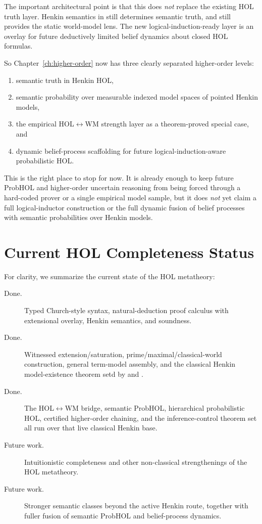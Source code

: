 \documentclass[11pt,openany]{report}
\begin{document}
The important architectural point is that this does \emph{not} replace the
existing HOL truth layer.  Henkin semantics in
 still determines semantic
truth, and  still provides the
static world-model lens.  The new logical-induction-ready layer is an overlay
for future deductively limited belief dynamics about closed HOL formulas.

So Chapter~\ref{ch:higher-order} now has three clearly separated higher-order
levels:
\begin{enumerate}
\item semantic truth in Henkin HOL,
\item semantic probability over measurable indexed model spaces of pointed
  Henkin models,
\item the empirical HOL$\leftrightarrow$WM strength layer as a theorem-proved
  special case, and
\item dynamic belief-process scaffolding for future logical-induction-aware
  probabilistic HOL.
\end{enumerate}

This is the right place to stop for now.  It is already enough to keep future
ProbHOL and higher-order uncertain reasoning from being forced through a
hard-coded prover or a single empirical model sample, but it does \emph{not}
yet claim a full logical-inductor construction or the full dynamic fusion of
belief processes with semantic probabilities over Henkin models.

\section{Current HOL Completeness Status}
\label{sec:hol-completeness-status}

For clarity, we summarize the current state of the HOL metatheory:

\begin{description}
\item[Done.] Typed Church-style syntax, natural-deduction proof calculus
  with extensional overlay, Henkin semantics, and soundness.
\item[Done.] Witnessed extension/saturation, prime/maximal/classical-world
  construction, general term-model assembly, and the classical Henkin
  model-existence theorem setd by
   and
  .
\item[Done.] The HOL$\leftrightarrow$WM bridge, semantic ProbHOL,
  hierarchical probabilistic HOL, certified higher-order chaining, and the
  inference-control theorem set all run over that live classical Henkin
  base.
\item[Future work.] Intuitionistic completeness and other non-classical
  strengthenings of the HOL metatheory.
\item[Future work.] Stronger semantic classes beyond the active Henkin route,
  together with fuller fusion of semantic ProbHOL and belief-process dynamics.
\end{description}
\end{document}
